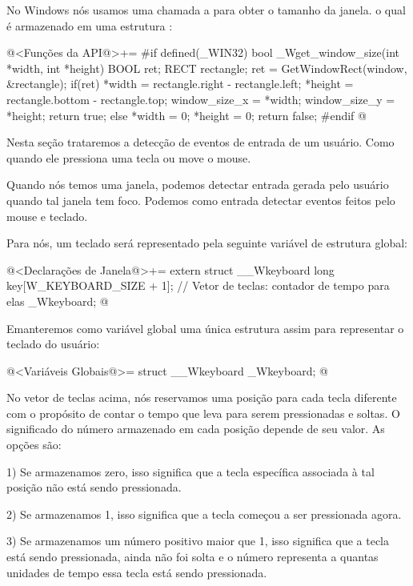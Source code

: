 
No Windows nós usamos uma chamada a  para
obter o tamanho da janela. o qual é armazenado em uma
estrutura :

\iniciocodigo
@<Funções da API@>+=
#if defined(_WIN32)
bool _Wget_window_size(int *width, int *height){
  BOOL ret;
  RECT rectangle;
  ret = GetWindowRect(window, &rectangle);
  if(ret){
    *width = rectangle.right - rectangle.left;
    *height = rectangle.bottom - rectangle.top;
    window_size_x = *width;
    window_size_y = *height;
    return true;
  }
  else{
    *width = 0;
    *height = 0;
    return false;
  }
}
#endif
@
\fimcodigo


Nesta seção trataremos a detecção de eventos de entrada de um
usuário. Como quando ele pressiona uma tecla ou move o mouse.


Quando nós temos uma janela, podemos detectar entrada gerada pelo
usuário quando tal janela tem foco. Podemos como entrada detectar
eventos feitos pelo mouse e teclado.

Para nós, um teclado será representado pela seguinte variável de
estrutura global:

\iniciocodigo
@<Declarações de Janela@>+=
extern struct __Wkeyboard{
  long key[W_KEYBOARD_SIZE + 1]; // Vetor de teclas: contador de tempo para elas
} _Wkeyboard;
@
\fimcodigo

Emanteremos como variável global uma única estrutura assim para
representar o teclado do usuário:

\iniciocodigo
@<Variáveis Globais@>=
struct __Wkeyboard _Wkeyboard;
@
\fimcodigo


No vetor de teclas acima, nós reservamos uma posição para cada tecla
diferente com o propósito de contar o tempo que leva para serem
pressionadas e soltas. O significado do número armazenado em cada
posição depende de seu valor. As opções são:

1) Se armazenamos zero, isso significa que a tecla específica
associada à tal posição não está sendo pressionada.

2) Se armazenamos 1, isso significa que a tecla começou a ser
pressionada agora.

3) Se armazenamos um número positivo maior que 1, isso significa que a
tecla está sendo pressionada, ainda não foi solta e o número
representa a quantas unidades de tempo essa tecla está sendo
pressionada.

